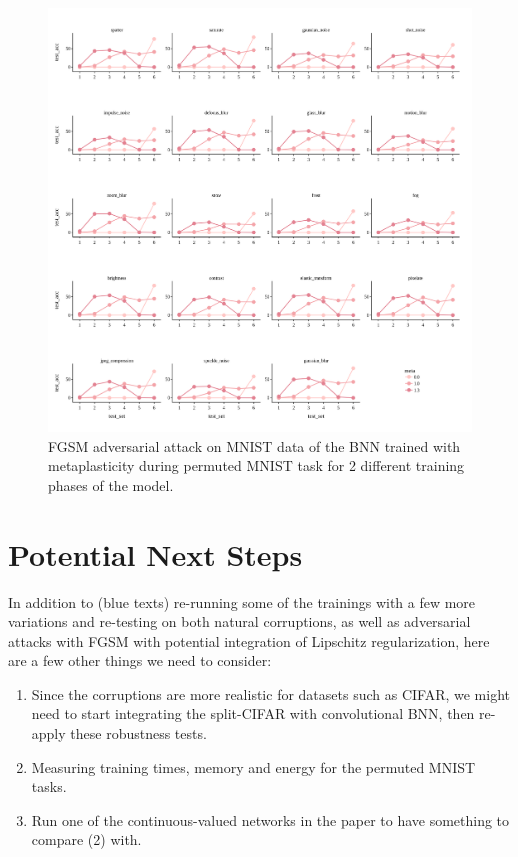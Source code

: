 \documentclass[manuscript,screen,review]{acmart}
\begin{document}
\begin{figure}
    \centering
    \includegraphics[width=\textwidth]{figures/report/Fig6.png}
    \caption{FGSM adversarial attack on MNIST data of the BNN trained with metaplasticity during permuted MNIST task for 2 different training phases of the model. 
    }
    \label{fig:fig6}
\end{figure}

\section{Potential Next Steps}

In addition to (blue texts) re-running some of the trainings with a few more variations and re-testing on both natural corruptions, as well as adversarial attacks with FGSM with potential integration of Lipschitz regularization, here are a few other things we need to consider:
\begin{enumerate}
    \item Since the corruptions are more realistic for datasets such as CIFAR, we might need to start integrating the split-CIFAR with convolutional BNN, then re-apply these robustness tests.
    \item Measuring training times, memory and energy for the permuted MNIST tasks.
    \item Run one of the continuous-valued networks in the paper to have something to compare (2) with.
\end{enumerate}
\end{document}

